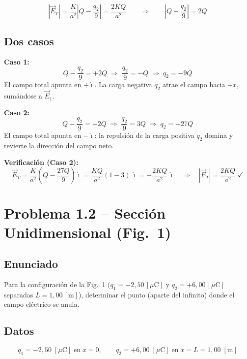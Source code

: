 \documentclass[12pt,letterpaper]{article}
\begin{document}
\[
    |\vec{E}_T| = \frac{K}{a^2}\left|Q - \frac{q_2}{9}\right| = \frac{2KQ}{a^2}
    \qquad\Longrightarrow\qquad
    \left|Q - \frac{q_2}{9}\right| = 2Q
\]

\subsection*{Dos casos}

\noindent\textbf{Caso 1:}
\[
    Q - \frac{q_2}{9} = +2Q \;\Rightarrow\; \frac{q_2}{9} = -Q
    \;\Rightarrow\; \boxed{q_2 = -9Q}
\]
El campo total apunta en $+\hat{\imath}$. La carga negativa $q_2$ atrae
el campo hacia $+x$, sum\'andose a $\vec{E}_1$. \checkmark

\medskip
\noindent\textbf{Caso 2:}
\[
    Q - \frac{q_2}{9} = -2Q \;\Rightarrow\; \frac{q_2}{9} = 3Q
    \;\Rightarrow\; \boxed{q_2 = +27Q}
\]
El campo total apunta en $-\hat{\imath}$: la repulsi\'on de la carga positiva
$q_2$ domina y revierte la direcci\'on del campo neto. \checkmark

\medskip
\noindent\textbf{Verificaci\'on (Caso 2):}
\[
    \vec{E}_T = \frac{K}{a^2}\!\left(Q - \frac{27Q}{9}\right)\hat{\imath}
    = \frac{KQ}{a^2}(1-3)\,\hat{\imath} = -\frac{2KQ}{a^2}\,\hat{\imath}
    \quad\Rightarrow\quad |\vec{E}_T| = \frac{2KQ}{a^2} \;\checkmark
\]

\clearpage

\section*{\textcolor{ubbblue}{Problema 1.2 \;--\; Secci\'on Unidimensional (Fig.\ 1)}}

\subsection*{Enunciado}

Para la configuraci\'on de la Fig.\ 1 ($q_1 = -2{,}50\,[\mu\text{C}]$ y
$q_2 = +6{,}00\,[\mu\text{C}]$ separadas $L = 1{,}00\,[\text{m}]$),
determinar el punto (aparte del infinito) donde el campo el\'ectrico se anula.

\subsection*{Datos}

\[
    q_1 = -2{,}50\;[\mu\text{C}]\;\text{en}\; x=0, \qquad
    q_2 = +6{,}00\;[\mu\text{C}]\;\text{en}\; x = L = 1{,}00\;[\text{m}]
\]
\end{document}
